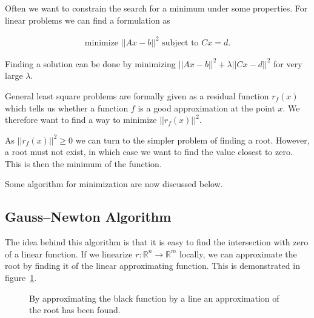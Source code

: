 Often we want to constrain the search for a minimum under some properties. For linear problems we can find a formulation as

\begin{align*}
	\text{minimize } ||Ax-b||^2 \text{ subject to } Cx=d.
\end{align*}

Finding a solution can be done by minimizing $||Ax-b||^2 + \lambda ||Cx-d||^2$ for very large $\lambda$.

General least square problems are formally given as a residual function $r_f(x)$ which tells us whether a function $f$ is a good approximation at the point $x$. We therefore want to find a way to minimize $||r_f(x)||^2$.

As $||r_f(x)||^2 \geq 0$ we can turn to the simpler problem of finding a root. However, a root must not exist, in which case we want to find the value closest to zero. This is then the minimum of the function.

Some algorithm for minimization are now discussed below.

\subsection{Gauss–Newton Algorithm}

The idea behind this algorithm is that it is easy to find the intersection with zero of a linear function. If we linearize $r:\mathbb{R}^n \rightarrow \mathbb{R}^m$ locally, we can approximate the root by finding it of the linear approximating function. This is demonstrated in figure~\ref{fig:approx_root_with_lin}.

\begin{figure}[h]
	\centering
	\caption{By approximating the black function by a line an approximation of the root has been found.}
	\label{fig:approx_root_with_lin}
\end{figure}

